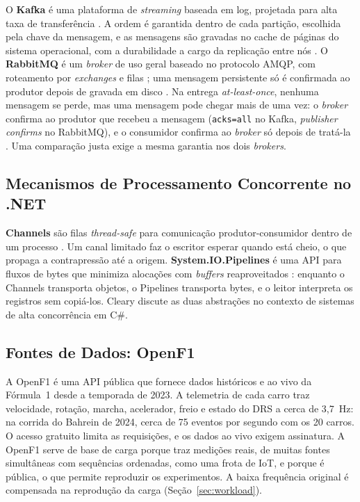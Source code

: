 \documentclass[12pt]{article}
\begin{document}
O \textbf{Kafka} é uma plataforma de \textit{streaming} baseada em log, projetada para alta taxa
de transferência \cite{kreps:2011}. A ordem é garantida dentro de cada partição, escolhida
pela chave da mensagem, e as mensagens são gravadas no cache de páginas do sistema
operacional, com a durabilidade a cargo da replicação entre nós \cite{kafka:docs}. O
\textbf{RabbitMQ} é um \textit{broker} de uso geral baseado no protocolo AMQP, com roteamento por
\textit{exchanges} e filas \cite{videla:2012}; uma mensagem persistente só é confirmada ao
produtor depois de gravada em disco \cite{rabbitmq:docs}. Na entrega
\textit{at-least-once}, nenhuma mensagem se perde, mas uma mensagem pode chegar mais de
uma vez: o \textit{broker} confirma ao produtor que recebeu a mensagem (\texttt{acks=all} no Kafka,
\textit{publisher confirms} no RabbitMQ), e o consumidor confirma ao \textit{broker} só depois de
tratá-la \cite{kafka:docs,rabbitmq:docs}. Uma comparação justa exige a mesma garantia nos
dois \textit{brokers}.

\subsection{Mecanismos de Processamento Concorrente no .NET}

\textbf{Channels} são filas \textit{thread-safe} para comunicação produtor-consumidor dentro de um
processo \cite{microsoft:channels}. Um canal limitado faz o escritor esperar quando está
cheio, o que propaga a contrapressão até a origem. \textbf{System.IO.Pipelines} é uma API
para fluxos de bytes que minimiza alocações com \textit{buffers} reaproveitados
\cite{microsoft:pipelines}: enquanto o Channels transporta objetos, o Pipelines transporta
bytes, e o leitor interpreta os registros sem copiá-los. Cleary \cite{cleary:2019}
discute as duas abstrações no contexto de sistemas de alta concorrência em C\#.

\subsection{Fontes de Dados: OpenF1}

A OpenF1 \cite{openf1:2024} é uma API pública que fornece dados históricos e ao vivo da
Fórmula~1 desde a temporada de 2023. A telemetria de cada carro traz velocidade, rotação,
marcha, acelerador, freio e estado do DRS a cerca de 3,7~Hz: na corrida do Bahrein de
2024, cerca de 75 eventos por segundo com os 20 carros. O acesso gratuito limita as
requisições, e os dados ao vivo exigem assinatura. A OpenF1 serve de base de carga porque
traz medições reais, de muitas fontes simultâneas com sequências ordenadas, como uma frota
de IoT, e porque é pública, o que permite reproduzir os experimentos. A baixa frequência
original é compensada na reprodução da carga (Seção~\ref{sec:workload}).
\end{document}
